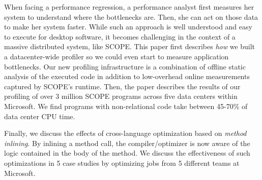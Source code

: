 


When facing a performance regression, a performance analyst first measures her system to understand where the bottlenecks are.  Then, she can act on those data to make her system faster.  While such an approach is well understood and easy to execute for desktop software, it becomes challenging in the context of a massive distributed system, like SCOPE.
This paper first describes \emph{how} we built a datacenter-wide profiler so we could even start to measure application bottlenecks.
Our new profiling infrastructure is a combination of offline static analysis of the executed code in addition to low-overhead online measurements captured by SCOPE's runtime.
Then, the paper describes the results of our profiling of over 3 million SCOPE programs across five data centers within Microsoft.
We find programs with non-relational code take between 45-70\% of data center CPU time.  

Finally, we discuss the effects of cross-language optimization based on \emph{method inlining}. 
By inlining a method call, the compiler/optimizer is now aware of the logic contained in the body of the method. 
We discuss the effectiveness of such optimizations in 5 case studies by optimizing jobs from 5 different teams at Microsoft. 


